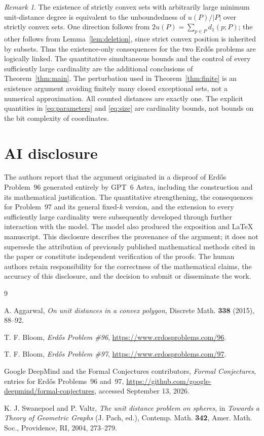 \documentclass[a4paper,11pt]{amsart}
\theoremstyle{remark}
\newtheorem{remark}[theorem]{Remark}
\begin{document}
\begin{remark}
The existence of strictly convex sets with arbitrarily large minimum
unit-distance degree is equivalent to the unboundedness of
$u(P)/|P|$ over strictly convex sets.
One direction follows from $2u(P)=\sum_{p\in P}d_1(p;P)$;
the other follows from Lemma~\ref{lem:deletion}, since strict convex
position is inherited by subsets.
Thus the existence-only consequences for the two Erd\H{o}s problems are
logically linked. The quantitative simultaneous bounds and the control
of every sufficiently large cardinality are the additional conclusions
of Theorem~\ref{thm:main}.
The perturbation used in Theorem~\ref{thm:finite} is an existence
argument avoiding finitely many closed exceptional sets, not a
numerical approximation. All counted distances are exactly one.
The explicit quantities in \eqref{eq:parameters} and \eqref{eq:size}
are cardinality bounds, not bounds on the bit complexity of coordinates.
\end{remark}

\section*{AI disclosure}
The authors report that the argument originated in a disproof of
Erd\H{o}s Problem~96 generated entirely by GPT~6 Astra, including the
construction and its mathematical justification. The quantitative
strengthening, the consequences for Problem~97 and its general
fixed-$k$ version, and the extension to every sufficiently large
cardinality were subsequently developed through further interaction
with the model. The model also produced the exposition and
\LaTeX{} manuscript. This disclosure describes the provenance of the
argument; it does not supersede the attribution of previously
published mathematical methods cited in the paper or constitute
independent verification of the proofs. The human authors retain
responsibility for the correctness of the mathematical claims, the
accuracy of this disclosure, and the decision to submit or
disseminate the work.

\begin{thebibliography}{9}

A. Aggarwal,
\emph{On unit distances in a convex polygon},
Discrete Math. \textbf{338} (2015), 88--92.

T. F. Bloom,
\emph{Erd\H{o}s Problem \#96},
\url{https://www.erdosproblems.com/96}.

T. F. Bloom,
\emph{Erd\H{o}s Problem \#97},
\url{https://www.erdosproblems.com/97}.

Google DeepMind and the Formal Conjectures contributors,
\emph{Formal Conjectures},
entries for Erd\H{o}s Problems~96 and~97,
\url{https://github.com/google-deepmind/formal-conjectures},
accessed September 13, 2026.

K. J. Swanepoel and P. Valtr,
\emph{The unit distance problem on spheres},
in \emph{Towards a Theory of Geometric Graphs} (J. Pach, ed.),
Contemp. Math. \textbf{342}, Amer. Math. Soc., Providence, RI, 2004,
273--279.

\end{thebibliography}
\end{document}
